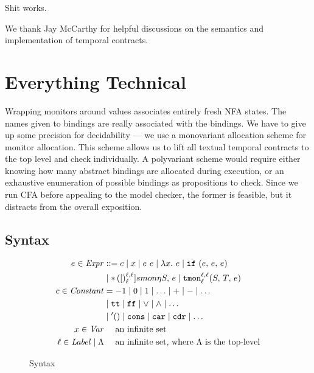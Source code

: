 \documentclass[preprint,onecolumn,9pt]{sigplanconf} %
\begin{document}
Shit works.

\acks We thank Jay McCarthy for helpful discussions on the semantics
and implementation of temporal contracts.


\section{Everything Technical}\label{sec:technical}

Wrapping monitors around values associates entirely fresh NFA states.
%
The names given to bindings are really associated with the bindings.
%
We have to give up some precision for decidability --- we use a monovariant allocation scheme for monitor allocation.
%
This scheme allows us to lift all textual temporal contracts to the top level and check individually.
%
A polyvariant scheme would require either knowing how many abstract bindings are allocated during execution, or an exhaustive enumeration of possible bindings as propositions to check.
%
Since we run CFA before appealing to the model checker, the former is feasible, but it distracts from the overall exposition.

\subsection{Syntax}

\begin{figure}
\begin{align*}
e \in \mathit{Expr} &::=
      c
 \mid x
 \mid e\ e
 \mid \lambda x.\ e
 \mid {\tt if}{\ }({e,\,e,\,e}) \\
&\mid {\tt *}{\,}({[})^{\ell,\ell}_{\ell}]{smon}{\eta}{S,\, e}
 \mid {\tt tmon}{^{\ell,\ell}_{\ell}}({S,\,T,\,e}) \\
c \in \mathit{Constant} &=
 -1 \mid 0 \mid 1 \mid \ldots \mid + \mid - \mid \ldots \\
&\mid {\tt tt} \mid {\tt ff} \mid \vee \mid \wedge \mid \ldots \\
&\mid {\tt '()} \mid \tt cons \mid {\tt car} \mid {\tt cdr} \mid \ldots \\
x \in \mathit{Var} &\quad\text{ an infinite set} \\
\ell \in \mathit{Label} \mid \Lambda &\quad\text{ an infinite set, where $\Lambda$ is the top-level}
\end{align*}
\caption{Syntax}
\label{fig:syntax}
\end{figure}
\end{document}
